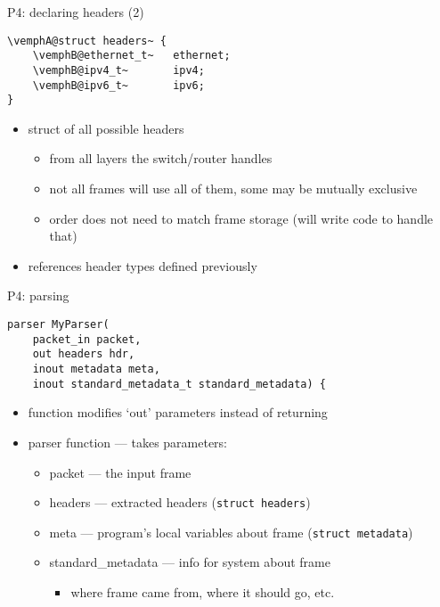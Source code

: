 \begin{frame}[fragile]{P4: declaring headers (2)}
\providecommand{\vemphA}[1]{\myemph<2>{#1}}
\providecommand{\vemphB}[1]{\myemph<3>{#1}}
\providecommand{\vemphC}[1]{\myemph<4>{#1}}
\providecommand{\vemphD}[1]{\myemph<5>{#1}}
\begin{Verbatim}[fontsize=\small,commandchars=\\@~]
\vemphA@struct headers~ {
    \vemphB@ethernet_t~   ethernet;
    \vemphB@ipv4_t~       ipv4;
    \vemphB@ipv6_t~       ipv6;
}
\end{Verbatim}
\begin{itemize}
\item<2-> struct of all possible headers
    \begin{itemize}
    \item from all layers the switch/router handles
    \item not all frames will use all of them, some may be mutually exclusive
    \item order does not need to match frame storage (will write code to handle that)
    \end{itemize}
\item<3-> references header types defined previously
\end{itemize}
\end{frame}

\begin{frame}[fragile]{P4: parsing}
\begin{Verbatim}
parser MyParser(
    packet_in packet,
    out headers hdr,
    inout metadata meta,
    inout standard_metadata_t standard_metadata) {
\end{Verbatim}
\begin{itemize}
\item function modifies `out' parameters instead of returning
\item parser function --- takes parameters:
    \begin{itemize}
    \item packet --- the input frame
    \item headers --- extracted headers (\texttt{struct headers})
    \item meta --- program's local variables about frame (\texttt{struct metadata})
    \item standard\_metadata --- info for system about frame
        \begin{itemize}
        \item where frame came from, where it should go, etc.
        \end{itemize}
    \end{itemize}
\end{itemize}
\end{frame}

